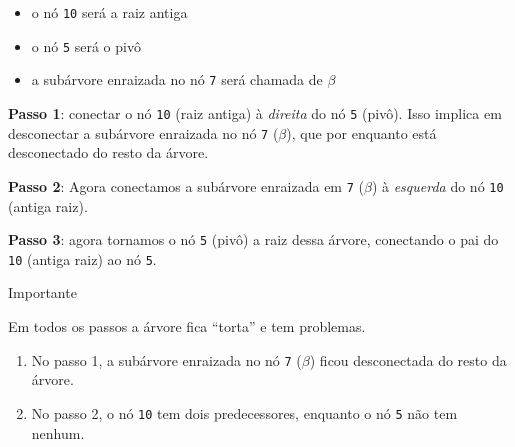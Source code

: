 \documentclass[]{article}
\providecommand{\tightlist}{%
  \setlength{\itemsep}{0pt}\setlength{\parskip}{0pt}}
\begin{document}
\begin{adjustwidth}{0pt}{10em}
{\par}

\begin{itemize}
\tightlist
\item
  o nó \texttt{10} será a raiz antiga
\item
  o nó \texttt{5} será o pivô
\item
  a subárvore enraizada no nó \texttt{7} será chamada de \(\beta\)
\end{itemize}

\textbf{Passo 1}: conectar o nó \texttt{10} (raiz antiga) à
\emph{direita} do nó \texttt{5} (pivô). Isso implica em desconectar a
subárvore enraizada no nó \texttt{7} (\(\beta\)), que por enquanto está
desconectado do resto da árvore.

\hfill{}

\textbf{Passo 2}: Agora conectamos a subárvore enraizada em \texttt{7}
(\(\beta\)) à \emph{esquerda} do nó \texttt{10} (antiga raiz).

\hfill{}

\textbf{Passo 3}: agora tornamos o nó \texttt{5} (pivô) a raiz dessa
árvore, conectando o pai do \texttt{10} (antiga raiz) ao nó \texttt{5}.

\hfill{}

\begin{boxYellow}{Importante}

Em todos os passos a árvore fica ``torta'' e tem problemas.

\begin{enumerate}
\def\labelenumi{\arabic{enumi}.}
\tightlist
\item
  No passo 1, a subárvore enraizada no nó \texttt{7} (\(\beta\)) ficou
  desconectada do resto da árvore.
\item
  No passo 2, o nó \texttt{10} tem dois predecessores, enquanto o nó
  \texttt{5} não tem nenhum.
\end{enumerate}


\end{boxYellow}
\end{adjustwidth}
\end{document}
